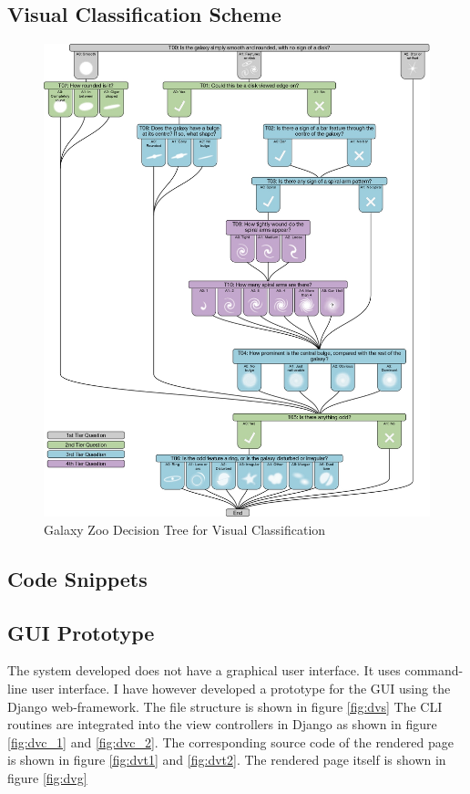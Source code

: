 \subsection{Visual Classification Scheme}
\begin{figure}[H]
	\centering
	\includegraphics[width=\linewidth, height=\textheight, keepaspectratio]{images/tree.jpg}
	\caption{Galaxy Zoo Decision Tree for Visual Classification}
\end{figure}
\newpage
\subsection{Code Snippets}
\subsection{GUI Prototype}
The system developed does not have a graphical user interface. It uses command-line user interface. I have however developed a prototype for the GUI using the Django web-framework. The file structure is shown in figure \ref{fig:dvs} The CLI routines are integrated into the view controllers in Django as shown in figure \ref{fig:dvc_1} and \ref{fig:dvc_2}. The corresponding source code of the rendered page is shown in figure \ref{fig:dvt1} and \ref{fig:dvt2}. The rendered page itself is shown in figure \ref{fig:dvg}

